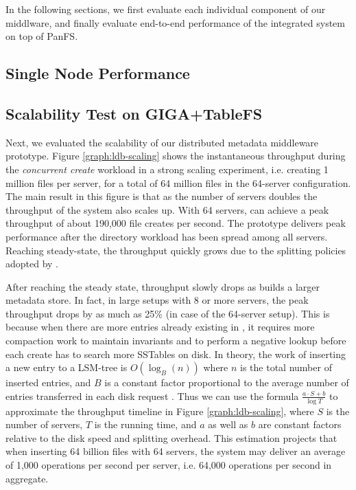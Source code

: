 In the following sections, we first evaluate each individual component
of our middlware, and finally evaluate end-to-end performance of
the integrated system on top of PanFS.

\subsection{Single Node Performance}

\subsection{Scalability Test on GIGA+TableFS}
Next, we evaluated the scalability of our distributed metadata middleware
prototype.
Figure \ref{graph:ldb-scaling} shows the instantaneous throughput during the
\textit{concurrent create} workload in a strong scaling experiment, i.e.
creating 1 million files per server, for a total of 64 million files in the
64-server configuration.
The main result in this figure is that as the number of servers doubles the
throughput of the system also scales up. With 64 servers, \giga{} can achieve a
peak throughput of about 190,000 file creates per second. The prototype delivers
peak performance after the directory workload has been spread among all
servers.
Reaching steady-state, the throughput quickly grows due to the splitting
policies adopted by \giga{}.

After reaching the steady state, throughput slowly drops as \ldb builds a
larger metadata store.
In fact, in large setups with 8 or more servers,
the peak throughput drops by as much as 25\% (in case of the 64-server setup).
This is because when there are more entries already existing in \ldb,
it requires more compaction work to maintain \ldb invariants and to perform a
negative lookup before each create has to search more SSTables on disk.
In theory, the work of inserting a new entry to a LSM-tree is $O(\log_{B}(n))$
where $n$ is the total number of inserted entries, and $B$ is a constant factor
proportional to the average number of entries transferred in each disk request
\cite{Bender2007}.
Thus we can use the formula $\frac{a\cdot S+b}{\log{T}}$ to
approximate the throughput timeline in Figure \ref{graph:ldb-scaling},
where $S$ is the number of servers, $T$ is the running time, and $a$ as well as $b$
are constant factors relative to the disk speed and splitting overhead.
This estimation projects that when inserting 64 billion files with 64 servers,
the system may deliver an average of 1,000 operations per second per server,
i.e. 64,000 operations per second in aggregate.

